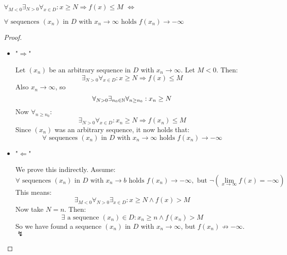 \documentclass[week=6]{homework}
\begin{document}
\begin{questions}
\begin{parts}
        \begin{toprove}
        	$\forall_{M < 0} \exists_{N > 0} \forall_{x \in D} : x \ge N \Rightarrow f(x) \le M$ $\iff$
        	
        	$\forall \text{ sequences } (x_n) \text{ in } D \text{ with } x_n \to \infty \text{ holds } f(x_n) \to - \infty$
        \end{toprove}
        \begin{proof}
        	
        	\begin{itemize}        		
        		\item "$\Rightarrow$"
        		
        		Let $(x_n)$ be an arbitrary sequence in $D$ with $x_n \to \infty$. Let $M < 0$. Then:
        		\[
	        		\exists_{N > 0} \forall_{x \in D} : x \ge N \Rightarrow f(x) \le M
        		\]
        		Also $x_n \to \infty$, so
        		\[
	        		\forall_{N > 0} \exists_{n_0 \in \mathbb{N}} \forall_{n \ge n_0} : x_n \ge N
        		\]
        		Now $\forall_{n \ge n_0}$: 
        		\[
	        		\exists_{N > 0} \forall_{x \in D} : x_n \ge N \Rightarrow f(x_n) \le M
        		\]
        		Since $(x_n)$ was an arbitrary sequence, it now holds that:
        		\[
	        		\forall \text{ sequences } (x_n) \text{ in } D \text{ with } x_n \to \infty \text{ holds } f(x_n) \to - \infty
        		\]
        		
        		\item "$\Leftarrow$"
        		
        		We prove this indirectly. Assume:
        		\[
	        		\forall \text{ sequences } (x_n) \text{ in } D \text{ with } x_n \to b \text{ holds } f(x_n) \to - \infty, \text{ but } \neg( \lim_{x \to \infty} f(x) = - \infty)
        		\]
        		This means:
        		\[
	        		\exists_{M < 0} \forall_{N > 0} \exists_{x \in D} : x \ge N \wedge f(x) > M
        		\]
        		Now take $N = n$. Then: 
        		\[
	        		\exists \text{ a sequence } (x_n) \in D : x_n \ge n \wedge f(x_n) > M
        		\]
        		So we have found a sequence $(x_n)$ in $D$ with $x_n \to \infty$, but $f(x_n) \not \to - \infty$. $\lightning$
        		
        		
        	\end{itemize}
        \end{proof}	
                      	
        \end{parts}            
        

\end{questions}
\end{document}

